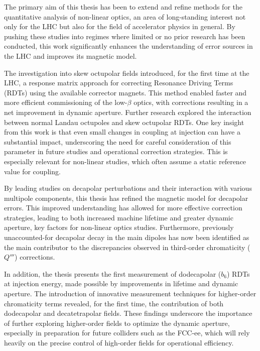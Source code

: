 \label{chapter:conclusions}

The primary aim of this thesis has been to extend and refine methods for the quantitative analysis
of non-linear optics, an area of long-standing interest not only for the LHC but also for the field
of accelerator physics in general. By pushing these studies into regimes where limited or no prior
research has been conducted, this work significantly enhances the understanding of error sources in
the LHC and improves its magnetic model.

The investigation into skew octupolar fields introduced, for the first time at the LHC, a response
matrix approach for correcting Resonance Driving Terms (RDTs) using the available corrector magnets.
This method enabled faster and more efficient commissioning of the low-$\beta$ optics, with
corrections resulting in a net improvement in dynamic aperture. Further research explored the
interaction between normal Landau octupoles and skew octupolar RDTs. One key insight from this work
is that even small changes in coupling at injection can have a substantial impact, underscoring the
need for careful consideration of this parameter in future studies and operational correction
strategies. This is especially relevant for non-linear studies, which often assume a static
reference value for coupling.

By leading studies on decapolar perturbations and their interaction with various multipole
components, this thesis has refined the magnetic model for decapolar errors. This improved
understanding has allowed for more effective correction strategies, leading to both increased
machine lifetime and greater dynamic aperture, key factors for non-linear optics studies.
Furthermore, previously unaccounted-for decapolar decay in the main dipoles has now been identified
as the main contributor to the discrepancies observed in third-order chromaticity ($Q'''$)
corrections.

In addition, the thesis presents the first measurement of dodecapolar ($b_6$) RDTs at injection
energy, made possible by improvements in lifetime and dynamic aperture. The introduction of
innovative measurement techniques for higher-order chromaticity terms revealed, for the first time,
the contribution of both dodecapolar and decatetrapolar fields. These findings underscore the
importance of further exploring higher-order fields to optimize the dynamic aperture, especially in
preparation for future colliders such as the FCC-ee, which will rely heavily on the precise control
of high-order fields for operational efficiency.

